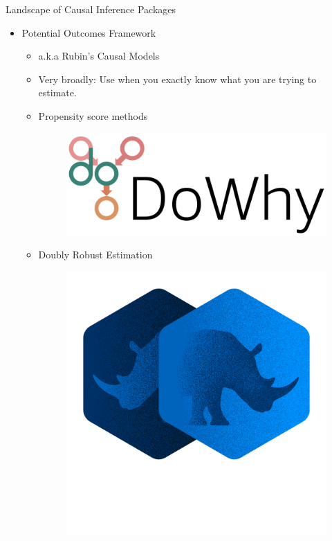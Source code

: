 \documentclass{beamer}
\begin{document}
\begin{frame}{Landscape of Causal Inference Packages}
	\begin{itemize}
		\item Potential Outcomes Framework
			\begin{itemize}
				\item a.k.a Rubin's Causal Models 
				\item Very broadly: Use when you exactly know what you are trying to estimate.
				\item Propensity score methods
					\begin{figure}
						\includegraphics[scale=0.1]{imgs/dowhy.png}
					\end{figure}
				\item Doubly Robust Estimation
					\begin{figure}
						\includegraphics[scale=0.1]{imgs/doubleml.png}

\end{figure}
\end{itemize}
\end{itemize}
\end{frame}
\end{document}
